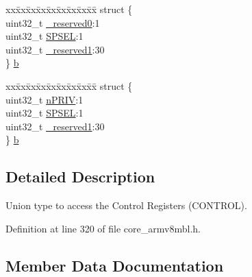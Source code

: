 \begin{DoxyCompactItemize}
\begin{tabbing}
\end{tabbing}\item 
\begin{tabbing}
xx\=xx\=xx\=xx\=xx\=xx\=xx\=xx\=xx\=\kill
struct \{\\
\>uint32\_t \hyperlink{union_c_o_n_t_r_o_l___type_af8c314273a1e4970a5671bd7f8184f50}{\_reserved0}:1\\
\>uint32\_t \hyperlink{union_c_o_n_t_r_o_l___type_a8cc085fea1c50a8bd9adea63931ee8e2}{SPSEL}:1\\
\>uint32\_t \hyperlink{union_c_o_n_t_r_o_l___type_aa7a5662079a447f801034d108f80ce49}{\_reserved1}:30\\
\} \hyperlink{union_c_o_n_t_r_o_l___type_a74825c7f3c406ac3223fb495b9dc0faf}{b}\\

\end{tabbing}\item 
\begin{tabbing}
xx\=xx\=xx\=xx\=xx\=xx\=xx\=xx\=xx\=\kill
struct \{\\
\>uint32\_t \hyperlink{union_c_o_n_t_r_o_l___type_a35c1732cf153b7b5c4bd321cf1de9605}{nPRIV}:1\\
\>uint32\_t \hyperlink{union_c_o_n_t_r_o_l___type_a8cc085fea1c50a8bd9adea63931ee8e2}{SPSEL}:1\\
\>uint32\_t \hyperlink{union_c_o_n_t_r_o_l___type_aa7a5662079a447f801034d108f80ce49}{\_reserved1}:30\\
\} \hyperlink{union_c_o_n_t_r_o_l___type_a77fc3330d8bb5e32bbe6f6c3d1379b45}{b}\\

\end{tabbing}\end{DoxyCompactItemize}


\subsection{Detailed Description}
Union type to access the Control Registers (C\+O\+N\+T\+R\+OL). 

Definition at line 320 of file core\+\_\+armv8mbl.\+h.



\subsection{Member Data Documentation}
\mbox{\label{union_c_o_n_t_r_o_l___type_af8c314273a1e4970a5671bd7f8184f50}} 
